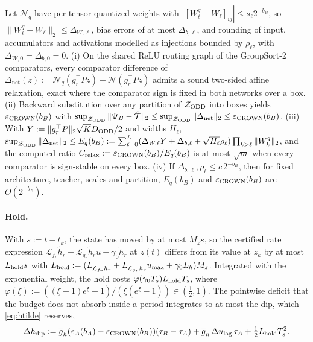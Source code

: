 \begin{proposition}
\label{prop:crown}
\label{prop:twin_crown}
Let $\mathcal{N}_q$ have per-tensor quantized weights with $|[W_\ell^q - W_\ell]_{ij}| \le s_\ell2^{-b_B}$, so $\|W_\ell^q - W_\ell\|_2 \le \Delta_{W,\ell}$, bias errors of at most $\Delta_{b,\ell}$, and rounding of input, accumulators and activations modelled as injections bounded by $\rho_\ell$, with $\Delta_{W,0} = \Delta_{b,0} = 0$. (i) On the shared ReLU routing graph of the GroupSort-2 comparators, every comparator difference of $\Delta_{\mathrm{net}}(z) := \mathcal{N}_q(g_r^\top Pz) - \mathcal{N}(g_r^\top Pz)$ admits a sound two-sided affine relaxation, exact where the comparator sign is fixed in both networks over a box. (ii) Backward substitution over any partition of $\mathcal{Z}_{\mathrm{ODD}}$ into boxes yields $\varepsilon_{\mathrm{CROWN}}(b_B)$ with $\sup_{\mathcal{Z}_{\mathrm{ODD}}}\|\Psi_B - \hat{\mathcal{T}}\|_2 \le \sup_{\mathcal{Z}_{\mathrm{ODD}}}\|\Delta_{\mathrm{net}}\|_2 \le \varepsilon_{\mathrm{CROWN}}(b_B)$. (iii) With $Y := \|g_r^\top P\|_2\sqrt{K}D_{\mathrm{ODD}}/2$ and widths $H_\ell$, $\sup_{\mathcal{Z}_{\mathrm{ODD}}}\|\Delta_{\mathrm{net}}\|_2 \le E_q(b_B) := \sum_{\ell=0}^L(\Delta_{W,\ell}Y + \Delta_{b,\ell} + \sqrt{H_\ell}\rho_\ell)\prod_{k>\ell}\|W_k^q\|_2$, and the computed ratio $C_{\mathrm{relax}} := \varepsilon_{\mathrm{CROWN}}(b_B)/E_q(b_B)$ is at most $\sqrt{m}$ when every comparator is sign-stable on every box. (iv) If $\Delta_{b,\ell}, \rho_\ell \le c\,2^{-b_B}$, then for fixed architecture, teacher, scales and partition, $E_q(b_B)$ and $\varepsilon_{\mathrm{CROWN}}(b_B)$ are $O(2^{-b_B})$.
\end{proposition}

\paragraph{Hold.}
With $s := t - t_k$, the state has moved by at most $M_zs$, so the certified rate expression $\mathcal{L}_{f_r}\tilde h_r + \mathcal{L}_{g_r}\tilde h_r u + \gamma_0\tilde h_r$ at $z(t)$ differs from its value at $z_k$ by at most $L_{\mathrm{hold}} s$ with $L_{\mathrm{hold}} := (L_{\mathcal{L}_{f_r}\tilde h_r} + L_{\mathcal{L}_{g_r}\tilde h_r}u_{\max} + \gamma_0L_h)M_z$. Integrated with the exponential weight, the hold costs $\varphi(\gamma_0T_s)L_{\mathrm{hold}} T_s$, where $\varphi(\xi) := ((\xi - 1)e^\xi + 1)/(\xi(e^\xi - 1)) \in (\tfrac12, 1)$. The pointwise deficit that the budget does not absorb inside a period integrates to at most the dip, which \eqref{eq:htilde} reserves,
\begin{equation}
\label{eq:dip}
\Delta h_{\mathrm{dip}} := \overline{g}_h(\varepsilon_A(b_A) - \varepsilon_{\mathrm{CROWN}}(b_B))(\tau_B - \tau_A) + \overline{g}_h\,\Delta u_{\mathrm{lag}}\,\tau_A + \tfrac12L_{\mathrm{hold}} T_s^2 .
\end{equation}

